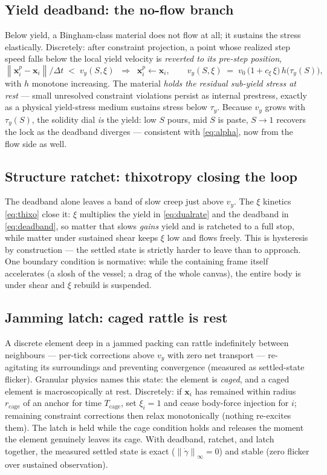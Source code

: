 \documentclass[11pt]{article}
\newcommand{\dt}{\Delta t}
\newcommand{\rate}{\dot{\gamma}}
\newcommand{\norm}[1]{\left\lVert #1 \right\rVert}
\begin{document}
\subsection{Yield deadband: the no-flow branch}
Below yield, a Bingham-class material does not flow at all; it sustains the stress elastically.
Discretely: after constraint projection, a point whose realized step speed falls below the
local yield velocity is \emph{reverted to its pre-step position},
\begin{equation}
\norm{\mathbf{x}^{p}_i-\mathbf{x}_i}/\dt \;<\; v_y(S,\xi)
\;\;\Longrightarrow\;\;
\mathbf{x}^{p}_i \gets \mathbf{x}_i,
\qquad
v_y(S,\xi)\;=\;v_0\,\big(1+c_\xi\,\xi\big)\,h\!\big(\tau_y(S)\big),
\label{eq:deadband}
\end{equation}
with $h$ monotone increasing. The material \emph{holds the residual sub-yield stress at rest}
--- small unresolved constraint violations persist as internal prestress, exactly as a physical
yield-stress medium sustains stress below $\tau_y$. Because $v_y$ grows with $\tau_y(S)$, the
solidity dial \emph{is} the yield: low $S$ pours, mid $S$ is paste, $S\to1$ recovers the lock as
the deadband diverges --- consistent with \eqref{eq:alpha}, now from the flow side as well.

\subsection{Structure ratchet: thixotropy closing the loop}
The deadband alone leaves a band of slow creep just above $v_y$. The $\xi$ kinetics
\eqref{eq:thixo} close it: $\xi$ multiplies the yield in \eqref{eq:dualrate} and the deadband in
\eqref{eq:deadband}, so matter that slows \emph{gains} yield and is ratcheted to a full stop,
while matter under sustained shear keeps $\xi$ low and flows freely. This is hysteresis by
construction --- the settled state is strictly harder to leave than to approach. One boundary
condition is normative: while the containing frame itself accelerates (a slosh of the vessel;
a drag of the whole canvas), the entire body is under shear and $\xi$ rebuild is suspended.

\subsection{Jamming latch: caged rattle is rest}
A discrete element deep in a jammed packing can rattle indefinitely between neighbours ---
per-tick corrections above $v_y$ with zero net transport --- re-agitating its surroundings and
preventing convergence (measured as settled-state flicker). Granular physics names this state:
the element is \emph{caged}, and a caged element is macroscopically at rest. Discretely: if
$\mathbf{x}_i$ has remained within radius $r_{\text{cage}}$ of an anchor for time
$T_{\text{cage}}$, set $\xi_i=1$ and cease body-force injection for $i$; remaining constraint
corrections then relax monotonically (nothing re-excites them). The latch is held while the
cage condition holds and releases the moment the element genuinely leaves its cage. With
deadband, ratchet, and latch together, the measured settled state is exact
($\norm{\rate}_\infty=0$) and stable (zero flicker over sustained observation).
\end{document}
